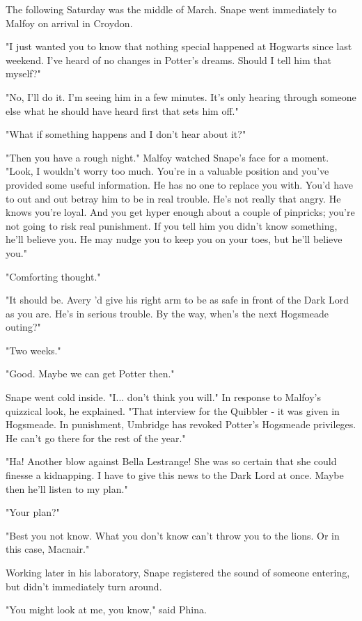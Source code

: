 \documentclass[a4paper,11pt]{article}
\begin{document}
The following Saturday was the middle of March. Snape went immediately to Malfoy on arrival in Croydon.

"I just wanted you to know that nothing special happened at Hogwarts since last weekend. I've heard of no changes in Potter's dreams. Should I tell him that myself?"

"No, I'll do it. I'm seeing him in a few minutes. It's only hearing through someone else what he should have heard first that sets him off."

"What if something happens and I don't hear about it?"

"Then you have a rough night." Malfoy watched Snape's face for a moment. "Look, I wouldn't worry too much. You're in a valuable position and you've provided some useful information. He has no one to replace you with. You'd have to out and out betray him to be in real trouble. He's not really that angry. He knows you're loyal. And you get hyper enough about a couple of pinpricks; you're not going to risk real punishment. If you tell him you didn't know something, he'll believe you. He may nudge you to keep you on your toes, but he'll believe you."

"Comforting thought."

"It should be. Avery 'd give his right arm to be as safe in front of the Dark Lord as you are. He's in serious trouble. By the way, when's the next Hogsmeade outing?"

"Two weeks."

"Good. Maybe we can get Potter then."

Snape went cold inside. "I... don't think you will." In response to Malfoy's quizzical look, he explained. "That interview for the Quibbler - it was given in Hogsmeade. In punishment, Umbridge has revoked Potter's Hogsmeade privileges. He can't go there for the rest of the year."

"Ha! Another blow against Bella Lestrange! She was so certain that she could finesse a kidnapping. I have to give this news to the Dark Lord at once. Maybe then he'll listen to my plan."

"Your plan?"

"Best you not know. What you don't know can't throw you to the lions. Or in this case, Macnair."

Working later in his laboratory, Snape registered the sound of someone entering, but didn't immediately turn around.

"You might look at me, you know," said Phina.
\end{document}
